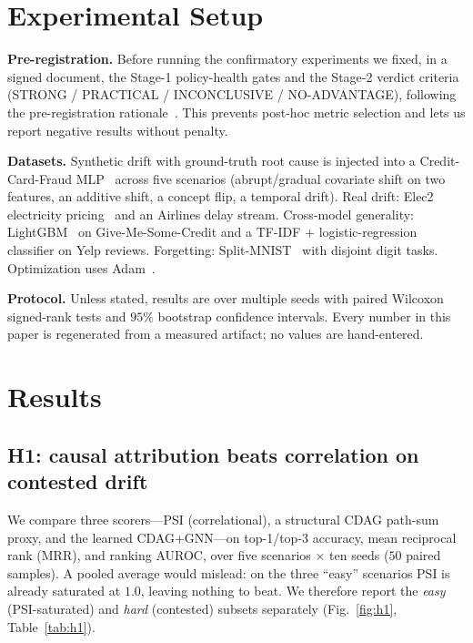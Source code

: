 \documentclass[conference]{IEEEtran}
\begin{document}
\section{Experimental Setup}\label{sec:setup}
\textbf{Pre-registration.} Before running the confirmatory experiments we
fixed, in a signed document, the Stage-1 policy-health gates and the
Stage-2 verdict criteria (STRONG / PRACTICAL / INCONCLUSIVE /
NO-ADVANTAGE), following the pre-registration
rationale~\cite{nosek2018preregistration,pineau2021reproducibility}. This
prevents post-hoc metric selection and lets us report negative results
without penalty.

\textbf{Datasets.} Synthetic drift with ground-truth root cause is
injected into a Credit-Card-Fraud MLP~\cite{dalpozzolo2015calibrating}
across five scenarios (abrupt/gradual covariate shift on two features, an
additive shift, a concept flip, a temporal drift). Real drift: Elec2
electricity pricing~\cite{harries1999splice} and an Airlines delay
stream. Cross-model generality: LightGBM~\cite{ke2017lightgbm} on
Give-Me-Some-Credit and a TF-IDF + logistic-regression classifier on Yelp
reviews. Forgetting: Split-MNIST~\cite{lecun1998mnist} with disjoint digit
tasks. Optimization uses Adam~\cite{kingma2015adam}.

\textbf{Protocol.} Unless stated, results are over multiple seeds with
paired Wilcoxon signed-rank tests and $95\%$ bootstrap confidence
intervals. Every number in this paper is regenerated from a measured
artifact; no values are hand-entered.

\section{Results}\label{sec:results}

\subsection{H1: causal attribution beats correlation on contested drift}\label{sec:h1}
We compare three scorers---PSI (correlational), a structural CDAG
path-sum proxy, and the learned CDAG+GNN---on top-1/top-3 accuracy, mean
reciprocal rank (MRR), and ranking AUROC, over five scenarios $\times$ ten
seeds ($50$ paired samples). A pooled average would mislead: on the three
``easy'' scenarios PSI is already saturated at $1.0$, leaving nothing to
beat. We therefore report the \emph{easy} (PSI-saturated) and \emph{hard}
(contested) subsets separately (Fig.~\ref{fig:h1}, Table~\ref{tab:h1}).
\end{document}
